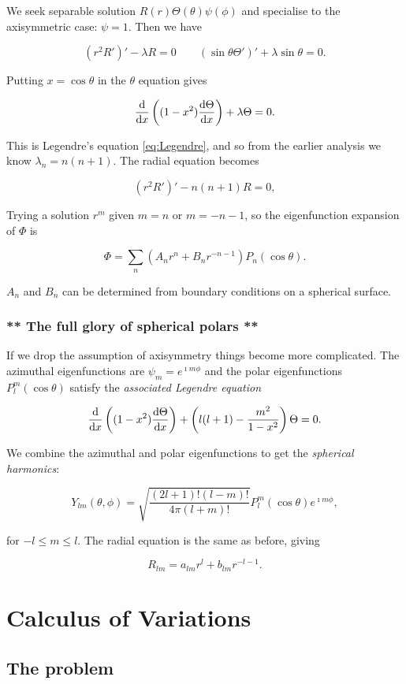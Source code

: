 \documentclass{notes}
\theoremstyle{plain}
\begin{document}
We seek separable solution $R(r) \Theta(\theta) \psi(\phi)$ and
specialise to the axisymmetric case:  $\psi = 1$.  Then we have

\[
(r^2 R')' - \lambda R = 0 \qquad (\sin \theta \Theta')' + \lambda \sin
\theta = 0.
\]

Putting $x = \cos \theta$ in the $\theta$ equation gives

\[
\frac{\mathrm{d}}{\mathrm{d} x} \left( (1-x^2) \frac{\mathrm{d}\Theta}{\mathrm{d} x} \right) + \lambda \Theta = 0.
\]

This is Legendre's equation \eqref{eq:Legendre}, and so from the
earlier analysis we know $\lambda_n = n(n+1)$.  The radial equation
becomes

\[
(r^2 R')'  - n(n+1) R = 0,
\]

Trying a solution $r^m$ given $m=n$ or $m = -n-1$, so the
eigenfunction expansion of $\Phi$ is

\[
\Phi = \sum_n \left(A_n r^n + B_n r^{-n-1} \right) P_n(\cos \theta).
\]

$A_n$ and $B_n$ can be determined from boundary conditions on a
spherical surface.

\subsection[The full glory of spherical polars]%
{** The full glory of spherical polars **}

If we drop the assumption of axisymmetry things become more
complicated.  The azimuthal eigenfunctions are $\psi_m = e^{\imath m
  \phi}$ and the polar eigenfunctions $P_l^m(\cos \theta)$ satisfy the
\emph{associated Legendre equation}

\[
\frac{\mathrm{d}}{\mathrm{d} x} \left( (1-x^2) \frac{\mathrm{d}\Theta}{\mathrm{d} x} \right) + \left(
l (l+1) - \frac{m^2}{1-x^2}\right) \Theta = 0.
\]

We combine the azimuthal and polar eigenfunctions to get the
\emph{spherical harmonics}:

\[
Y_{lm}(\theta,\phi) = \sqrt{\frac{(2 l + 1)! (l-m)!}{4 \pi (l+m)!}}
P_l^m(\cos \theta) e^{\imath m \phi},
\]

for $-l \le m \le l$.  The radial equation is the same as before, giving

\[
R_{lm} = a_{lm} r^l + b_{lm} r^{-l-1}.
\]

\chapter{Calculus of Variations}

\section{The problem}
\end{document}
